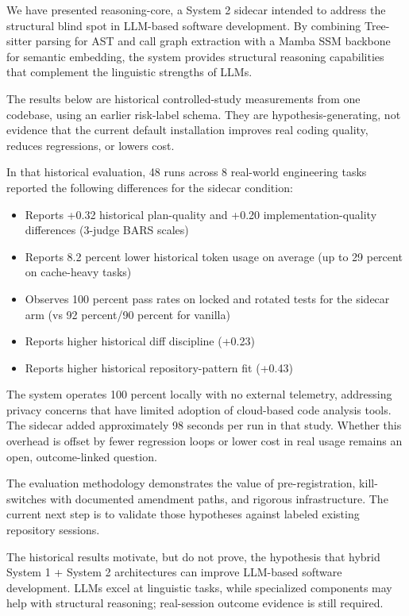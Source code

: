 
We have presented reasoning-core, a System 2 sidecar intended to address the
structural blind spot in LLM-based software development. By combining
Tree-sitter parsing for AST and call graph extraction with a Mamba SSM backbone
for semantic embedding, the system provides structural reasoning capabilities
that complement the linguistic strengths of LLMs.

The results below are historical controlled-study measurements from one
codebase, using an earlier risk-label schema. They are hypothesis-generating,
not evidence that the current default installation improves real coding
quality, reduces regressions, or lowers cost.

In that historical evaluation, 48 runs across 8 real-world engineering tasks
reported the following differences for the sidecar condition:

\begin{itemize}
    \item Reports +0.32 historical plan-quality and +0.20 implementation-quality differences (3-judge BARS scales)
    \item Reports 8.2 percent lower historical token usage on average (up to 29 percent on cache-heavy tasks)
    \item Observes 100 percent pass rates on locked and rotated tests for the sidecar arm (vs 92 percent/90 percent for vanilla)
    \item Reports higher historical diff discipline (+0.23)
    \item Reports higher historical repository-pattern fit (+0.43)
\end{itemize}

The system operates 100 percent locally with no external telemetry, addressing privacy concerns that have limited adoption of cloud-based code analysis tools. The sidecar added approximately 98 seconds per run in that study. Whether this
overhead is offset by fewer regression loops or lower cost in real usage
remains an open, outcome-linked question.

The evaluation methodology demonstrates the value of pre-registration,
kill-switches with documented amendment paths, and rigorous infrastructure.
The current next step is to validate those hypotheses against labeled existing
repository sessions.

The historical results motivate, but do not prove, the hypothesis that hybrid
System 1 + System 2 architectures can improve LLM-based software development.
LLMs excel at linguistic tasks, while specialized components may help with
structural reasoning; real-session outcome evidence is still required.

